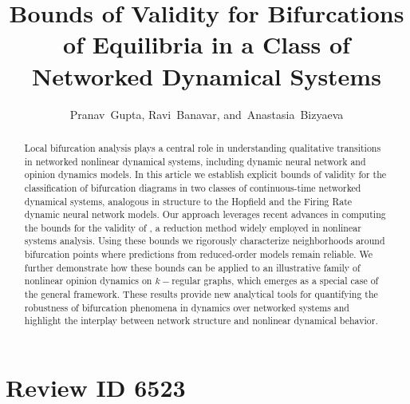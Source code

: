 \documentclass[letterpaper, 10 pt, conference]{ieeeconf}
\title{\bf Bounds of Validity for Bifurcations of Equilibria in a Class of Networked Dynamical Systems}
\author{
    Pranav~Gupta,
    Ravi~Banavar,
    and~Anastasia~Bizyaeva
}
\begin{document}
\maketitle
\thispagestyle{empty}
\pagestyle{empty}


\begin{abstract}
    Local bifurcation analysis plays a central role in understanding qualitative transitions in networked nonlinear dynamical systems, including dynamic neural network and opinion dynamics models. In this article we establish explicit bounds of validity for the classification of bifurcation diagrams in two classes of continuous-time networked dynamical systems, analogous in structure to the Hopfield and the Firing Rate dynamic neural network models. Our approach leverages recent advances in computing the bounds for the validity of \LSR{}, a reduction method widely employed in nonlinear systems analysis. Using these bounds we rigorously characterize neighborhoods around bifurcation points where predictions from reduced-order models remain reliable. We further demonstrate how these bounds can be applied to an illustrative family of nonlinear opinion dynamics on \(k-\)regular graphs, which emerges as a special case of the general framework. These results provide new analytical tools for quantifying the robustness of bifurcation phenomena in dynamics over networked systems and highlight the interplay between network structure and nonlinear dynamical behavior.
\end{abstract}


\section{Review ID 6523}
\end{document}

